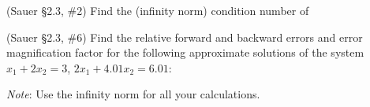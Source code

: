 \documentclass[12pt,fleqn]{exam}
\begin{document}
\begin{questions}
\question (Sauer \S2.3, \#2) Find the (infinity norm) condition number of


\question (Sauer \S2.3, \#6) Find the relative forward and backward errors and error magnification factor for the following approximate solutions of the system $x_1 + 2 x_2 = 3$, $2 x_1 + 4.01 x_2 = 6.01$:


\emph{Note}: Use the infinity norm for all your calculations.

\end{questions}
\end{document}
